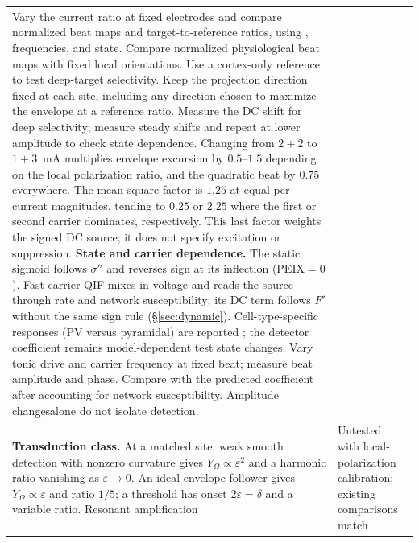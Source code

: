 \documentclass[11pt,a4paper]{article}
\newcommand{\Sig}{\sigma}
\providecommand{\DIFaddtex}[1]{{\protect\color{blue} \sf #1}} %
\providecommand{\DIFdeltex}[1]{{\protect\color{red} \scriptsize #1}} %
\providecommand{\DIFaddFL}[1]{\DIFadd{#1}} %
\providecommand{\DIFdelFL}[1]{\DIFdel{#1}} %
\providecommand{\DIFaddbeginFL}{} %
\providecommand{\DIFaddendFL}{} %
\providecommand{\DIFdelbeginFL}{} %
\providecommand{\DIFdelendFL}{} %
\providecommand{\DIFadd}[1]{\texorpdfstring{\DIFaddtex{#1}}{#1}} %
\providecommand{\DIFdel}[1]{\texorpdfstring{\DIFdeltex{#1}}{}} %
\begin{document}
\begin{table}[htbp]
\begin{tabular}{@{}>{\raggedright\arraybackslash}p{}
 >{\raggedright\arraybackslash}p{}@{}}
{}%
\DIFdelendFL Vary the current ratio at fixed electrodes\DIFdelbeginFL \DIFdelFL{and compare normalized beat maps
and target-to-reference ratios, using }\DIFdelendFL \DIFaddbeginFL \DIFaddFL{,
frequencies, and state. Compare normalized physiological beat maps with fixed
local orientations. Use }\DIFaddendFL a cortex-only reference \DIFdelbeginFL \DIFdelFL{to test deep-target
selectivity. Keep the projection direction fixed at each site,
including any direction chosen to maximize the envelope at a reference ratio.
Measure the DC shift }\DIFdelendFL \DIFaddbeginFL \DIFaddFL{for deep selectivity; measure
steady shifts }\DIFaddendFL and repeat at lower amplitude to \DIFdelbeginFL \DIFdelFL{check state dependence.
Changing from $2+2$ to $1+3$~mA multiplies envelope excursion by
$0.5$--$1.5$ depending on the local polarization ratio, and the quadratic beat
by $0.75$ everywhere. The mean-square factor is $1.25$ at equal per-current magnitudes,
tending to $0.25$ or $2.25$ where the first or second carrier dominates,
respectively. This last factor weights the signed DC source; it does not
specify excitation or suppression. }%
\DIFdelFL{\textbf{State and carrier dependence.} The static sigmoid follows $\Sig''$ and
reverses sign at its inflection (PEIX$=0$). Fast-carrier QIF mixes in voltage and
reads the source through rate and network susceptibility; its DC term follows
$F'$ without the same sign rule (\S\ref{sec:dynamic}).
}%
\DIFdelFL{Cell-type-specific responses (PV versus pyramidal) are reported
\cite{caldas2024}; the detector coefficient remains model-dependent}\DIFdelendFL \DIFaddbeginFL \DIFaddFL{test state changes}\DIFaddendFL . \DIFdelbeginFL %
\DIFdelFL{Vary tonic drive and carrier frequency at fixed beat; measure beat amplitude
and phase. Compare with the predicted coefficient after accounting for network
susceptibility. Amplitude changesalone do not isolate detection. }\DIFdelendFL \\[4pt]
\DIFdelbeginFL \DIFdelFL{\textbf{Transduction class.} At a matched site, weak smooth detection with nonzero
curvature gives $Y_\Omega\propto\varepsilon^2$ and a harmonic ratio vanishing as
$\varepsilon\to0$. An ideal envelope follower gives $Y_\Omega\propto\varepsilon$
and ratio $1/5$; a threshold has onset $2\varepsilon=\delta$ and a variable ratio.
}\DIFdelendFL \DIFaddbeginFL \DIFaddFL{Resonant amplification }\DIFaddendFL & \DIFdelbeginFL \DIFdelFL{Untested with local-polarization calibration; existing comparisons match
}
\end{tabular}
\end{table}
\end{document}
